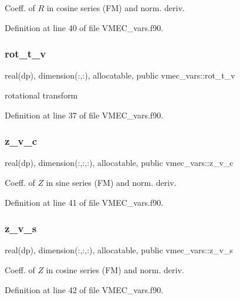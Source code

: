 Coeff. of $R$ in cosine series (FM) and norm. deriv. 



Definition at line 40 of file V\+M\+E\+C\+\_\+vars.\+f90.

\mbox{\label{namespacevmec__vars_a676475bc7e07d96fc91c2773c8d2c84a}} 
\subsubsection{\texorpdfstring{rot\+\_\+t\+\_\+v}{rot\_t\_v}}
{\footnotesize\ttfamily real(dp), dimension(\+:,\+:), allocatable, public vmec\+\_\+vars\+::rot\+\_\+t\+\_\+v}



rotational transform 



Definition at line 37 of file V\+M\+E\+C\+\_\+vars.\+f90.

\mbox{\label{namespacevmec__vars_a66130a0eb0bc39ae0294f008f283efcd}} 
\subsubsection{\texorpdfstring{z\+\_\+v\+\_\+c}{z\_v\_c}}
{\footnotesize\ttfamily real(dp), dimension(\+:,\+:,\+:), allocatable, public vmec\+\_\+vars\+::z\+\_\+v\+\_\+c}



Coeff. of $Z$ in sine series (FM) and norm. deriv. 



Definition at line 41 of file V\+M\+E\+C\+\_\+vars.\+f90.

\mbox{\label{namespacevmec__vars_ac6a5f1ccefd4c0337189c09166558bb1}} 
\subsubsection{\texorpdfstring{z\+\_\+v\+\_\+s}{z\_v\_s}}
{\footnotesize\ttfamily real(dp), dimension(\+:,\+:,\+:), allocatable, public vmec\+\_\+vars\+::z\+\_\+v\+\_\+s}



Coeff. of $Z$ in cosine series (FM) and norm. deriv. 



Definition at line 42 of file V\+M\+E\+C\+\_\+vars.\+f90.

